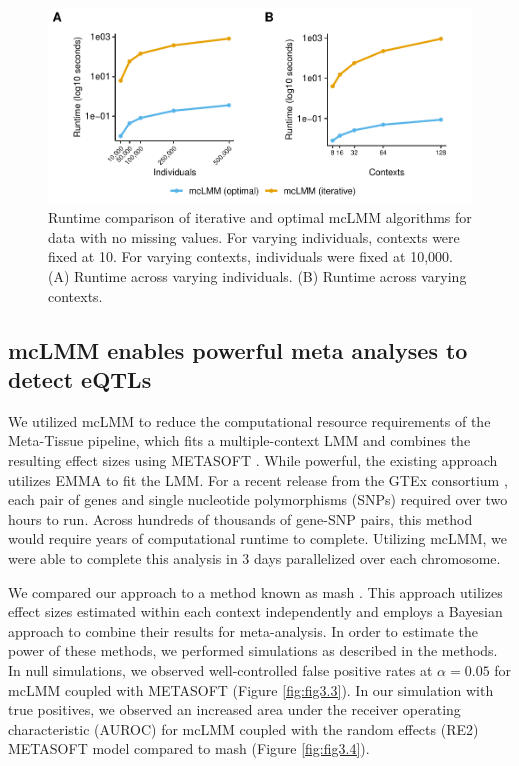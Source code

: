         \begin{figure}
            \centering
            \includegraphics[width=\textwidth]{chapter3/figures/Figure_2.pdf}
            \caption{Runtime comparison of iterative and optimal mcLMM algorithms for data with no missing values. For varying individuals, contexts were fixed at 10. For varying contexts, individuals were fixed at 10,000. (A) Runtime across varying individuals. (B) Runtime across varying contexts.}
            \label{fig:fig3.2}
        \end{figure}
    
    \subsection{mcLMM enables powerful meta analyses to detect eQTLs}
        We utilized mcLMM to reduce the computational resource requirements of the Meta-Tissue pipeline, which fits a multiple-context LMM and combines the resulting effect sizes using METASOFT \cite{Sul}. While powerful, the existing approach utilizes EMMA to fit the LMM. For a recent release from the GTEx consortium  \cite{GTEx_Consortium2020-xx}, each pair of genes and single nucleotide polymorphisms (SNPs) required over two hours to run. Across hundreds of thousands of gene-SNP pairs, this method would require years of computational runtime to complete. Utilizing mcLMM, we were able to complete this analysis in 3 days parallelized over each chromosome. 
        
        We compared our approach to a method known as mash \cite{Urbut2019}. This approach utilizes effect sizes estimated within each context independently and employs a Bayesian approach to combine their results for meta-analysis. In order to estimate the power of these methods, we performed simulations as described in the methods. In null simulations, we observed well-controlled false positive rates at $\alpha = 0.05$ for mcLMM coupled with METASOFT (Figure \ref{fig:fig3.3}). In our simulation with true positives, we observed an increased area under the receiver operating characteristic (AUROC) for mcLMM coupled with the random effects (RE2) METASOFT model compared to mash (Figure \ref{fig:fig3.4}).
        
